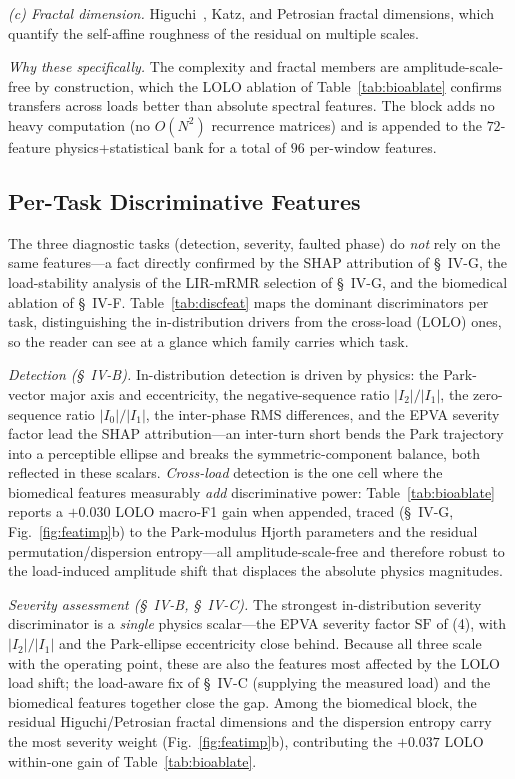 \documentclass[journal]{IEEEtran}
\begin{document}
\emph{(c) Fractal dimension.} Higuchi~\cite{higuchi1988}, Katz, and Petrosian fractal
dimensions, which quantify the self-affine roughness of the residual on multiple scales.

\emph{Why these specifically.} The complexity and fractal members are amplitude-scale-free
by construction, which the LOLO ablation of Table~\ref{tab:bioablate} confirms transfers
across loads better than absolute spectral features. The block adds no heavy computation
(no $O(N^2)$ recurrence matrices) and is appended to the $72$-feature physics+statistical
bank for a total of $96$ per-window features.

\subsection{Per-Task Discriminative Features}
\label{sec:features-disc}
The three diagnostic tasks (detection, severity, faulted phase) do \emph{not} rely on the
same features---a fact directly confirmed by the SHAP attribution of \S~IV-G,
the load-stability analysis of the LIR-mRMR selection of \S~IV-G, and the biomedical
ablation of \S~IV-F. Table~\ref{tab:discfeat} maps the dominant discriminators per task,
distinguishing the in-distribution drivers from the cross-load (LOLO) ones, so the reader
can see at a glance which family carries which task.

\emph{Detection (\S~IV-B).} In-distribution detection is driven by physics: the Park-vector
major axis and eccentricity, the negative-sequence ratio $|I_2|/|I_1|$, the zero-sequence
ratio $|I_0|/|I_1|$, the inter-phase RMS differences, and the EPVA severity factor lead
the SHAP attribution---an inter-turn short bends the Park trajectory into a perceptible
ellipse and breaks the symmetric-component balance, both reflected in these scalars.
\emph{Cross-load} detection is the one cell where the biomedical features measurably
\emph{add} discriminative power: Table~\ref{tab:bioablate} reports a $+0.030$ LOLO macro-F1
gain when appended, traced (\S~IV-G, Fig.~\ref{fig:featimp}b) to the Park-modulus Hjorth
parameters and the residual permutation/dispersion entropy---all amplitude-scale-free and
therefore robust to the load-induced amplitude shift that displaces the absolute physics
magnitudes.

\emph{Severity assessment (\S~IV-B, \S~IV-C).} The strongest in-distribution severity
discriminator is a \emph{single} physics scalar---the EPVA severity factor $\mathrm{SF}$
of (4), with $|I_2|/|I_1|$ and the Park-ellipse eccentricity close behind. Because all
three scale with the operating point, these are also the features most affected by the
LOLO load shift; the load-aware fix of \S~IV-C (supplying the measured load) and the
biomedical features together close the gap. Among the biomedical block, the residual
Higuchi/Petrosian fractal dimensions and the dispersion entropy carry the most severity
weight (Fig.~\ref{fig:featimp}b), contributing the $+0.037$ LOLO within-one gain of
Table~\ref{tab:bioablate}.
\end{document}
